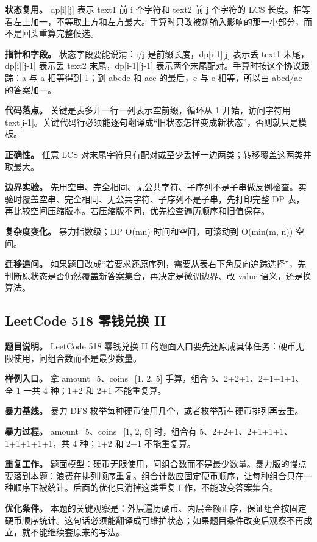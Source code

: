 \textbf{状态复用。} dp[i][j] 表示 text1 前 i 个字符和 text2 前 j 个字符的 LCS 长度。相等看左上加一，不等取上方和左方最大。手算时只改被新输入影响的那一小部分，而不是回头重算完整候选。

\textbf{指针和字段。} 状态字段要能说清：i/j 是前缀长度，dp[i-1][j] 表示丢 text1 末尾，dp[i][j-1] 表示丢 text2 末尾，dp[i-1][j-1] 表示两个末尾配对。手算时按这个协议跟踪：a 与 a 相等得到 1；到 abcde 和 ace 的最后，e 与 e 相等，所以由 abcd/ac 的答案加一。

\textbf{代码落点。} 关键是表多开一行一列表示空前缀，循环从 1 开始，访问字符用 text[i-1]。关键代码行必须能逐句翻译成“旧状态怎样变成新状态”，否则就只是模板。

\textbf{正确性。} 任意 LCS 对末尾字符只有配对或至少丢掉一边两类；转移覆盖这两类并取最大。

\textbf{边界实验。} 先用空串、完全相同、无公共字符、子序列不是子串做反例检查。实验时覆盖空串、完全相同、无公共字符、子序列不是子串，先打印完整 DP 表，再比较空间压缩版本。若压缩版不同，优先检查遍历顺序和旧值保存。

\textbf{复杂度变化。} 暴力指数级；DP O(mn) 时间和空间，可滚动到 O(min(m, n)) 空间。

\textbf{迁移追问。} 如果题目改成“若要求还原序列，需要从表右下角反向追踪选择”，先判断原状态是否仍然覆盖新答案集合，再决定是微调边界、改 value 语义，还是换算法。

\subsection{LeetCode 518 零钱兑换 II}

\textbf{题目说明。} LeetCode 518 零钱兑换 II 的题面入口要先还原成具体任务：硬币无限使用，问组合数而不是最少数量。

\textbf{样例入口。} 拿 amount=5、coins=[1, 2, 5] 手算，组合 5、2+2+1、2+1+1+1、全 1 一共 4 种；1+2 和 2+1 不能重复算。

\textbf{暴力基线。} 暴力 DFS 枚举每种硬币使用几个，或者枚举所有硬币排列再去重。

\textbf{暴力过程。} amount=5、coins=[1, 2, 5] 时，组合有 5、2+2+1、2+1+1+1、1+1+1+1+1，共 4 种；1+2 和 2+1 不能重复算。

\textbf{重复工作。} 题面模型：硬币无限使用，问组合数而不是最少数量。暴力版的慢点要落到本题：浪费在排列顺序重复。组合计数应固定硬币顺序，让每种组合只在一种顺序下被统计。后面的优化只消掉这类重复工作，不能改变答案集合。

\textbf{优化条件。} 本题的关键观察是：外层遍历硬币、内层金额正序，保证组合按固定硬币顺序统计。这句话必须能翻译成可维护状态；如果题目条件改变后观察不再成立，就不能继续套原来的写法。


